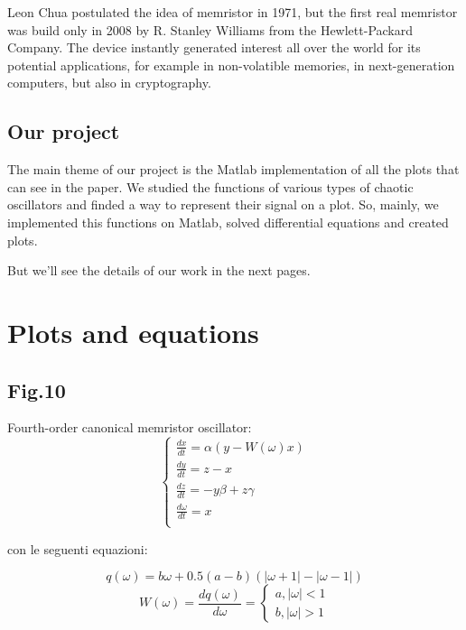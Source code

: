 \documentclass[12pt, a4paper]{book}
\begin{document}
Leon Chua postulated the idea of memristor in 1971, but the first real memristor
was build only in 2008 by R. Stanley Williams from the Hewlett-Packard Company.
The device instantly generated interest all over the world for its potential
applications, for example in non-volatible memories, in next-generation computers,
but also in cryptography.

\subsection{Our project}

The main theme of our project is the Matlab implementation of all the plots that
can see in the paper.
We studied the functions of various types of chaotic oscillators and finded a way
to represent their signal on a plot.
So, mainly, we implemented this functions on Matlab, solved differential 
equations and created plots.

But we'll see the details of our work in the next pages.

\section{Plots and equations}
\subsection{Fig.10}
Fourth-order canonical memristor oscillator:
\begin{equation}
\begin{cases}
\frac{dx}{dt}=\alpha(y-W(\omega)x)
\\
\frac{dy}{dt}=z-x
\\
\frac{dz}{dt}=-y\beta+z\gamma
\\
\frac{d\omega}{dt}=x
\\
\end{cases}
\end{equation}

con le seguenti equazioni:

\begin{equation}
q(\omega)=b\omega+0.5(a-b)(|\omega+1|-|\omega-1|)
\end{equation}
\begin{equation}
W(\omega)=\frac{dq(\omega)}{d\omega}=
\begin{cases}
a, |\omega|<1
\\
b, |\omega|>1
\end{cases}
\end{equation}
\end{document}
